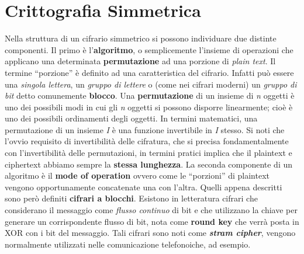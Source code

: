 \chapter{Crittografia Simmetrica}
Nella struttura di un cifrario simmetrico si possono individuare due distinte componenti. Il primo è l'\textbf{algoritmo}, o semplicemente l'insieme di operazioni che applicano una determinata \textbf{permutazione} ad una porzione di \textit{plain text}. Il termine ``porzione'' è definito ad una caratteristica del cifrario. Infatti può essere una \textit{singola lettera}, un \textit{gruppo di lettere} o (come nei cifrari moderni) un \textit{gruppo di bit} detto comunemente \textbf{blocco}. Una \textbf{permutazione} di un insieme di \textit{n} oggetti è uno dei possibili modi in cui gli \textit{n} oggetti si possono disporre linearmente; cioè è uno dei possibili ordinamenti degli oggetti. In termini matematici, una permutazione di un insieme \textit{I} è una funzione invertibile in \textit{I} stesso. Si noti che l'ovvio requisito di invertibilità delle cifratura, che si precisa fondamentalmente con l'invertibilità delle permutazioni, in termini pratici implica che il plaintext e ciphertext abbiamo sempre la \textbf{stessa lunghezza}. La seconda componente di un algoritmo è il \textbf{mode of operation} ovvero come le ``porzioni'' di plaintext vengono opportunamente concatenate una con l'altra.
\newline
Quelli appena descritti sono però definiti \textbf{cifrari a blocchi}. Esistono in letteratura cifrari che considerano il messaggio come \textit{flusso continuo} di bit e che utilizzano la chiave per generare un corrispondente flusso di bit, nota come \textbf{round key} che verrà posta in XOR con i bit del messaggio. Tali cifrari sono noti come \textbf{\textit{stram cipher}}, vengono normalmente utilizzati nelle comunicazione telefonoiche, ad esempio.

